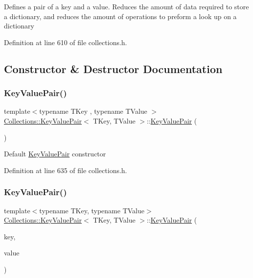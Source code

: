 Defines a pair of a key and a value. Reduces the amount of data required to store a dictionary, and reduces the amount of operations to preform a look up on a dictionary 

Definition at line 610 of file collections.\+h.



\subsection{Constructor \& Destructor Documentation}
\hypertarget{class_collections_1_1_key_value_pair_aa64a4c74132079a13bdc1469e43eb75a}{}\label{class_collections_1_1_key_value_pair_aa64a4c74132079a13bdc1469e43eb75a} 
\subsubsection{\texorpdfstring{Key\+Value\+Pair()}{KeyValuePair()}\hspace{0.1cm}{\footnotesize\ttfamily [1/2]}}
{\footnotesize\ttfamily template$<$typename T\+Key , typename T\+Value $>$ \\
\hyperlink{class_collections_1_1_key_value_pair}{Collections\+::\+Key\+Value\+Pair}$<$ T\+Key, T\+Value $>$\+::\hyperlink{class_collections_1_1_key_value_pair}{Key\+Value\+Pair} (\begin{DoxyParamCaption}{ }\end{DoxyParamCaption})}

Default \hyperlink{class_collections_1_1_key_value_pair}{Key\+Value\+Pair} constructor 

Definition at line 635 of file collections.\+h.

\hypertarget{class_collections_1_1_key_value_pair_a89b31d39dbe604c5ccf72989406925d3}{}\label{class_collections_1_1_key_value_pair_a89b31d39dbe604c5ccf72989406925d3} 
\subsubsection{\texorpdfstring{Key\+Value\+Pair()}{KeyValuePair()}\hspace{0.1cm}{\footnotesize\ttfamily [2/2]}}
{\footnotesize\ttfamily template$<$typename T\+Key, typename T\+Value$>$ \\
\hyperlink{class_collections_1_1_key_value_pair}{Collections\+::\+Key\+Value\+Pair}$<$ T\+Key, T\+Value $>$\+::\hyperlink{class_collections_1_1_key_value_pair}{Key\+Value\+Pair} (\begin{DoxyParamCaption}\item[{T\+Key}]{key,  }\item[{T\+Value}]{value }\end{DoxyParamCaption})}

